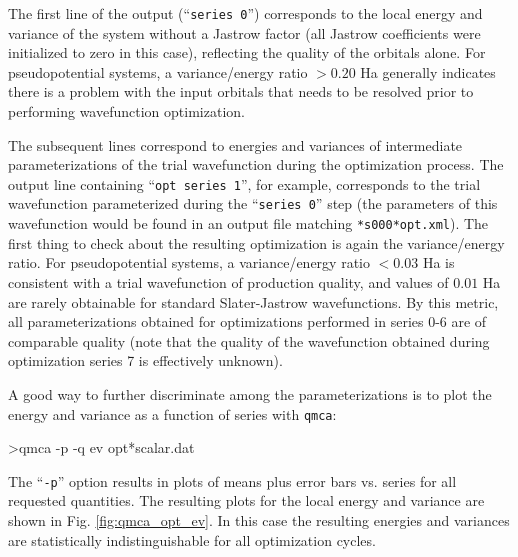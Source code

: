 The first line of 
the output (``\texttt{series 0}'') corresponds to the local energy 
and variance of the system without a Jastrow factor (all Jastrow 
coefficients were initialized to zero in this case), reflecting the 
quality of the orbitals alone. For pseudopotential systems, a 
variance/energy ratio $>0.20$ Ha generally indicates there is a problem 
with the input orbitals that needs to be resolved prior to 
performing wavefunction optimization.  

The subsequent lines correspond to energies and variances of 
intermediate parameterizations of the trial wavefunction during 
the optimization process.  The output line containing 
``\texttt{opt  series 1}'', for example, corresponds to the trial 
wavefunction parameterized during the ``\texttt{series 0}'' step 
(the parameters of this wavefunction would be found in an output 
file matching \texttt{*s000*opt.xml}).  The first thing to check 
about the resulting optimization is again the variance/energy ratio. 
For pseudopotential systems, a variance/energy ratio $<0.03$ Ha is 
consistent with a trial wavefunction of production quality, and values 
of $0.01$ Ha are rarely obtainable for standard Slater-Jastrow 
wavefunctions.  By this metric, all parameterizations obtained for 
optimizations performed in series 0-6 are of comparable quality 
(note that the quality of the wavefunction obtained during optimization 
series 7 is effectively unknown).

A good way to further discriminate among the parameterizations is to 
plot the energy and variance as a function of series with \texttt{qmca}:
\begin{shade}
>qmca -p -q ev opt*scalar.dat
\end{shade}
\noindent
The ``\texttt{-p}'' option results in plots of means plus error bars 
vs. series for all requested quantities.
The resulting plots for the local energy and variance are shown 
in Fig. \ref{fig:qmca_opt_ev}.  In this case the resulting energies 
and variances are statistically indistinguishable for all optimization 
cycles.  

